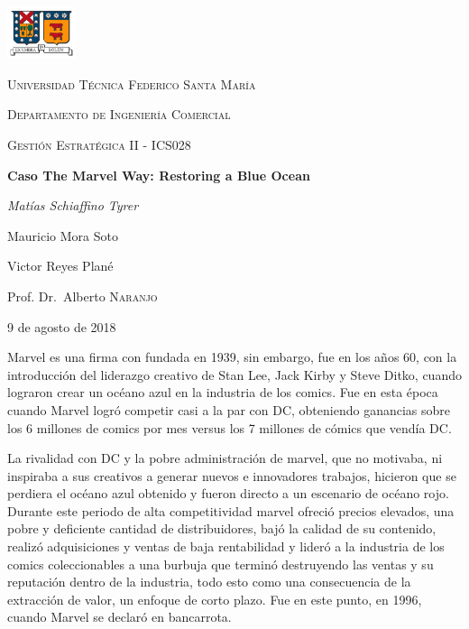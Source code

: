 \documentclass[letterpaper,12pt,oneside]{article}
\begin{document}
\begin{titlepage}
	\centering
	\includegraphics[width=0.15\textwidth]{logo_usm1}\par\vspace{1cm}
	{\scshape\LARGE Universidad Técnica Federico Santa María \par}
	{\scshape\LARGE Departamento de Ingeniería Comercial \par}
	\vspace{1cm}
	{\scshape\Large Gestión Estratégica II - ICS028\par}
	\vspace{1.5cm}
	{\huge\bfseries Caso The Marvel Way: Restoring a Blue Ocean\par}
	\vspace{2cm}
	{\Large\itshape Matías Schiaffino Tyrer\par
	Mauricio Mora Soto\par
	Victor Reyes Plané\par}
	\vfill
	Prof. Dr.~Alberto \textsc{Naranjo}
	\vfill
	{\large 9 de agosto de 2018\par}
\end{titlepage}

Marvel es una firma con fundada en 1939, sin embargo, fue en los años 60, con la introducción del liderazgo creativo de Stan Lee, Jack Kirby y Steve Ditko, cuando lograron crear un océano azul en la industria de los comics. Fue en esta época cuando Marvel logró competir casi a la par con DC, obteniendo ganancias sobre los 6 millones de comics por mes versus los 7 millones de cómics que vendía DC.

La rivalidad con DC y la pobre administración de marvel, que no motivaba, ni inspiraba a sus creativos a generar nuevos e innovadores trabajos, hicieron que se perdiera el océano azul obtenido y fueron directo a un escenario de océano rojo. Durante este periodo de alta competitividad marvel ofreció precios elevados, una pobre y deficiente cantidad de distribuidores, bajó la calidad de su contenido, realizó adquisiciones y ventas de baja rentabilidad y lideró a la industria de los comics coleccionables a una burbuja que terminó destruyendo las ventas y su reputación dentro de la industria, todo esto como una consecuencia de la extracción de valor, un enfoque de corto plazo. Fue en este punto, en 1996, cuando Marvel se declaró en bancarrota.
\end{document}
